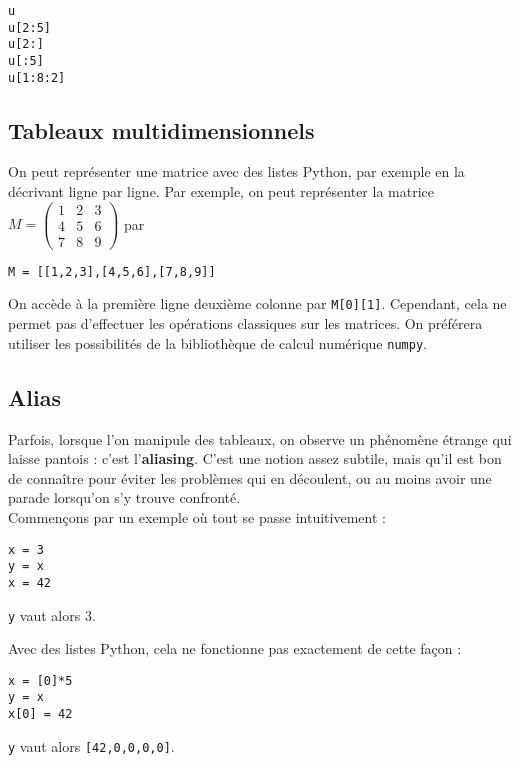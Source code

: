 \begin{lstlisting}
u
u[2:5]
u[2:]
u[:5]
u[1:8:2]
\end{lstlisting}

\subsection{Tableaux multidimensionnels}

On peut représenter une matrice avec des listes Python, par exemple en la décrivant ligne par 
ligne. 
Par exemple, on peut représenter la matrice 
$
  M=\begin{pmatrix}
    1&2&3 \\ 4&5&6 \\ 7&8&9
  \end{pmatrix}
$
par
\begin{lstlisting}
M = [[1,2,3],[4,5,6],[7,8,9]]
\end{lstlisting}
On accède à la première ligne deuxième colonne par \texttt{M[0][1]}.
Cependant, cela ne permet pas d'effectuer les opérations classiques sur les matrices. On préférera 
utiliser les possibilités de la bibliothèque de calcul numérique \texttt{numpy}.

\subsection{Alias}

Parfois, lorsque l'on manipule des tableaux, on observe un phénomène étrange qui laisse pantois : 
c'est l'\textbf{aliasing}. C'est une notion assez subtile, mais qu'il est bon de connaître pour 
éviter les problèmes qui en découlent, ou au moins avoir une parade lorsqu'on s'y trouve 
confronté.\\


Commençons par un exemple où tout se passe intuitivement :
\begin{lstlisting}
x = 3
y = x
x = 42
\end{lstlisting}

\texttt{y} vaut alors 3. 

Avec des listes Python, cela ne fonctionne pas exactement de cette façon : 
\begin{lstlisting}
x = [0]*5
y = x
x[0] = 42
\end{lstlisting}
\texttt{y} vaut alors \texttt{[42,0,0,0,0]}.


